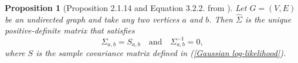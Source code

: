 \documentclass[10pt,a4paper]{article}
\newtheorem{proposition}{Proposition}
\begin{document}
\begin{proposition}[Proposition 2.1.14 and Equation 3.2.2. from \cite{drton2008lectures}]
Let $G=(V,E)$ be an undirected graph and take any two vertices $a$ and $b$. Then $\hat{\Sigma}$ is the unique positive-definite matrix that satisfies
\[\Sigma_{a,b}=S_{a,b} \quad \text{and}\quad \Sigma^{-1}_{a,b}=0,\]
where $S$ is the sample covariance matrix defined in (\ref{Gaussian log-likelihood}).

\end{proposition}




\end{document}
